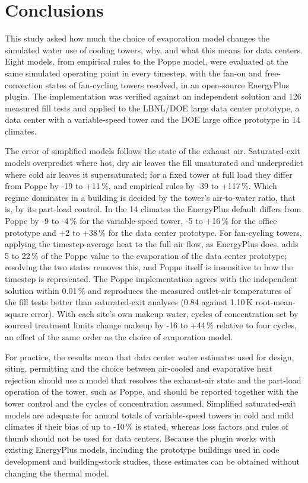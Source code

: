 \documentclass[preprint,12pt]{elsarticle}
\begin{document}
\section{Conclusions}\label{sec:conclusions}
This study asked how much the choice of evaporation model changes the simulated water use of cooling towers, why, and
what this means for data centers. Eight models, from empirical rules to the Poppe model, were evaluated at the same
simulated operating point in every timestep, with the fan-on and free-convection states of fan-cycling towers resolved,
in an open-source EnergyPlus plugin. The implementation was verified against an independent solution and 126 measured
fill tests and applied to the LBNL/DOE large data center prototype, a data center with a variable-speed tower and the
DOE large office prototype in 14 climates.

The error of simplified models follows the state of the exhaust air. Saturated-exit models overpredict where hot, dry
air leaves the fill unsaturated and underpredict where cold air leaves it supersaturated; for a fixed tower at full load
they differ from Poppe by -19 to +11\,\%, and empirical rules by -39 to +117\,\%. Which regime dominates in a building
is decided by the tower's air-to-water ratio, that is, by its part-load control. In the 14 climates the EnergyPlus default
differs from Poppe by -9 to -4\,\% for the variable-speed tower, -5 to +16\,\% for the office prototype and +2 to +38\,\%
for the data center prototype. For fan-cycling towers, applying the timestep-average heat to the full air flow, as
EnergyPlus does, adds 5 to 22\,\% of the Poppe value to the evaporation of the data center prototype; resolving the two
states removes this, and Poppe itself is insensitive to how the timestep is represented. The Poppe implementation agrees
with the independent solution within 0.01\,\% and reproduces the measured outlet-air temperatures of the fill tests
better than saturated-exit analyses (0.84 against 1.10\,K root-mean-square error). With each site's own makeup water,
cycles of concentration set by sourced treatment limits change makeup by -16 to +44\,\% relative to four cycles, an
effect of the same order as the choice of evaporation model.

For practice, the results mean that data center water estimates used for design, siting, permitting and the choice
between air-cooled and evaporative heat rejection should use a model that resolves the exhaust-air state and the
part-load operation of the tower, such as Poppe, and should be reported together with the tower control and the cycles
of concentration assumed. Simplified saturated-exit models are adequate for annual totals of variable-speed towers in
cold and mild climates if their bias of up to -10\,\% is stated, whereas loss factors and rules of thumb should not be
used for data centers. Because the plugin works with existing EnergyPlus models, including the prototype buildings used
in code development and building-stock studies, these estimates can be obtained without changing the thermal model.
\end{document}
